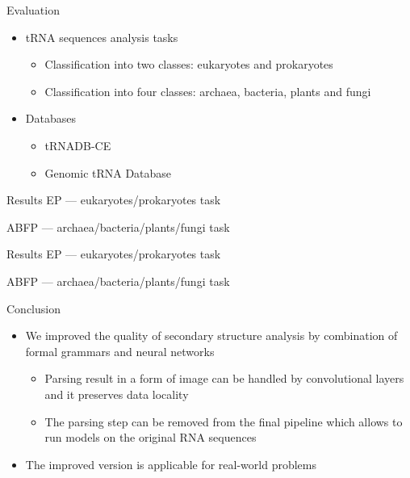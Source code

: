\documentclass[xcolor=table]{beamer}
\begin{document}
\begin{frame}{Evaluation}
\begin{itemize}
    \item tRNA sequences analysis tasks
    \begin{itemize}
        \item Classification into two classes: eukaryotes and prokaryotes
        \item Classification into four classes: archaea, bacteria, plants and fungi
    \end{itemize}
    \item Databases
    \begin{itemize}
        \item tRNADB-CE
        \item Genomic tRNA Database
    \end{itemize}
\end{itemize}
\end{frame}

\begin{frame}{Results}
EP --- eukaryotes/prokaryotes task

ABFP --- archaea/bacteria/plants/fungi task


\end{frame}

\begin{frame}{Results}
EP --- eukaryotes/prokaryotes task

ABFP --- archaea/bacteria/plants/fungi task


\end{frame}

\begin{frame}{Conclusion}
\begin{itemize}
    \item We improved the quality of secondary structure analysis by combination of formal grammars and neural networks 
    \begin{itemize}
        \item Parsing result in a form of image can be handled by convolutional layers and it preserves data locality
        \item The parsing step can be removed from the final pipeline which allows to run models on the original RNA sequences        
    \end{itemize}
    \item The improved version is applicable for real-world problems
\end{itemize}
\end{frame}
\end{document}
